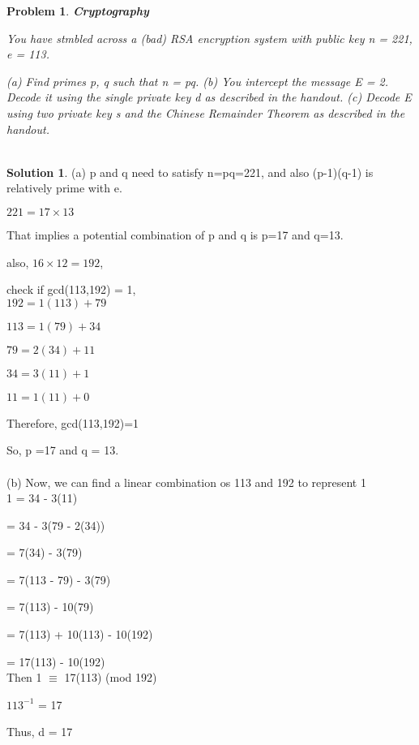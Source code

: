 \documentclass{article}
\newtheorem{problem}{Problem}
\theoremstyle{definition}
\newtheorem*{solution}{Solution}
\begin{document}
\begin{problem}
\textbf{Cryptography}

You have stmbled across a (bad) RSA encryption system with public key n = 221, e = 113.

(a) Find primes p, q such that n = pq.
(b) You intercept the message E = 2. Decode it using the single private key d as described in the handout.
(c) Decode E using two private key s and the Chinese Remainder Theorem as described in the handout.\\\\


\end{problem}

\begin{solution}
(a) p and q need to satisfy n=pq=221, and also (p-1)(q-1) is relatively prime with e.

\(221 = 17 \times 13 \)

That implies a potential combination of p and q is p=17 and q=13.

also, \(16 \times 12 = 192\),

check if gcd(113,192) = 1,\\

\(192 = 1(113) + 79\)

\(113 = 1(79) + 34\)

\(79 = 2(34) + 11\)

\(34= 3(11) + 1\)

\(11 = 1(11) + 0\)

Therefore, gcd(113,192)=1

So, p =17 and q = 13.\\\\

(b) Now, we can find a linear combination os 113 and 192 to represent 1\\

1 = 34 - 3(11)

= 34 - 3(79 - 2(34))

= 7(34) - 3(79)

= 7(113 - 79) - 3(79)

= 7(113) - 10(79)

= 7(113) + 10(113) - 10(192)

= 17(113) - 10(192)\\

Then 1 \(\equiv\) 17(113) (mod 192)

\(113^{-1}\) = 17

Thus, d = 17\\


\end{solution}
\end{document}

